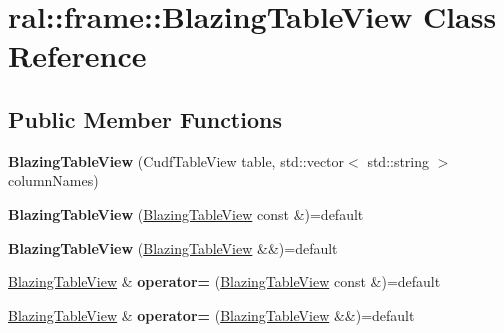 \hypertarget{classral_1_1frame_1_1BlazingTableView}{}\section{ral\+:\+:frame\+:\+:Blazing\+Table\+View Class Reference}
\label{classral_1_1frame_1_1BlazingTableView}
\subsection*{Public Member Functions}
\begin{DoxyCompactItemize}
\item 
\mbox{\label{classral_1_1frame_1_1BlazingTableView_aef63d115fc7d2cadcf2e2c811388b48d}} 
{\bfseries Blazing\+Table\+View} (Cudf\+Table\+View table, std\+::vector$<$ std\+::string $>$ column\+Names)
\item 
\mbox{\label{classral_1_1frame_1_1BlazingTableView_aa5395f0a1a0bda5fa44ffb36b40f6e5a}} 
{\bfseries Blazing\+Table\+View} (\hyperlink{classral_1_1frame_1_1BlazingTableView}{Blazing\+Table\+View} const \&)=default
\item 
\mbox{\label{classral_1_1frame_1_1BlazingTableView_a3ac765c7829f2aef5d563ae24a305dea}} 
{\bfseries Blazing\+Table\+View} (\hyperlink{classral_1_1frame_1_1BlazingTableView}{Blazing\+Table\+View} \&\&)=default
\item 
\mbox{\label{classral_1_1frame_1_1BlazingTableView_a67c2fada551518d1026b3bf81851b5e6}} 
\hyperlink{classral_1_1frame_1_1BlazingTableView}{Blazing\+Table\+View} \& {\bfseries operator=} (\hyperlink{classral_1_1frame_1_1BlazingTableView}{Blazing\+Table\+View} const \&)=default
\item 
\mbox{\label{classral_1_1frame_1_1BlazingTableView_a054fa47daa382903e253d2c2963dd68a}} 
\hyperlink{classral_1_1frame_1_1BlazingTableView}{Blazing\+Table\+View} \& {\bfseries operator=} (\hyperlink{classral_1_1frame_1_1BlazingTableView}{Blazing\+Table\+View} \&\&)=default
\item 
\mbox{\label{classral_1_1frame_1_1BlazingTableView_a5aa2bb6c557193c1ce9ffc6f4fe11bff}} 

\end{DoxyCompactItemize}
